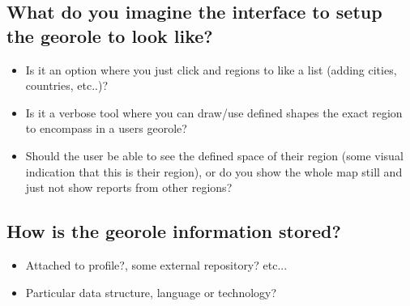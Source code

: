 \documentclass{article}
\begin{document}
\subsection*{What do you imagine the interface to setup the georole to look like?}
\begin{itemize}
\item Is it an option where you just click and regions to like a list (adding cities, countries, etc..)?
\item Is it a verbose tool where you can draw/use defined shapes the exact region to encompass in a users georole?
\item Should the user be able to see the defined space of their region (some visual indication that this is their region), 
      or do you show the whole map still and just not show reports from other regions?
\end{itemize}

\subsection*{How is the georole information stored?}
\begin{itemize}
\item Attached to profile?, some external repository? etc...
\item Particular data structure, language or technology?
\end{itemize}
\end{document}
